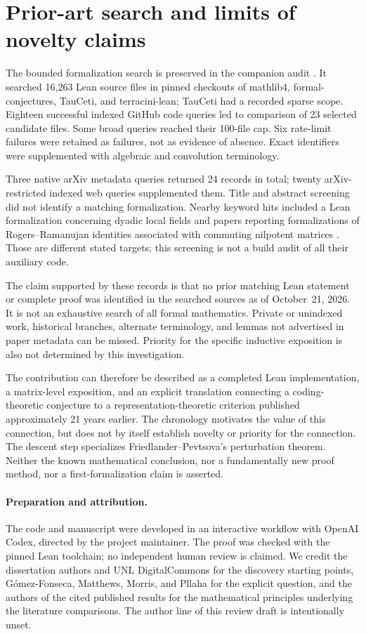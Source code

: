 \documentclass[11pt]{article}
\theoremstyle{definition}
\begin{document}
\section{Prior-art search and limits of novelty claims}\label{sec:priority}

The bounded formalization search is preserved in the companion audit \cite{artifact}. It searched 16,263 Lean source files in pinned checkouts of mathlib4, formal-conjectures, TauCeti, and terracini-lean; TauCeti had a recorded sparse scope. Eighteen successful indexed GitHub code queries led to comparison of 23 selected candidate files. Some broad queries reached their 100-file cap. Six rate-limit failures were retained as failures, not as evidence of absence. Exact identifiers were supplemented with algebraic and convolution terminology.

Three native arXiv metadata queries returned 24 records in total; twenty arXiv-restricted indexed web queries supplemented them. Title and abstract screening did not identify a matching formalization. Nearby keyword hits included a Lean formalization concerning dyadic local fields \cite{ueda} and papers reporting formalizations of Rogers--Ramanujan identities associated with commuting nilpotent matrices \cite{hlo,hlop}. Those are different stated targets; this screening is not a build audit of all their auxiliary code.

The claim supported by these records is that no prior matching Lean statement or complete proof was identified in the searched sources as of October~21, 2026. It is not an exhaustive search of all formal mathematics. Private or unindexed work, historical branches, alternate terminology, and lemmas not advertised in paper metadata can be missed. Priority for the specific inductive exposition is also not determined by this investigation.

The contribution can therefore be described as a completed Lean implementation, a matrix-level exposition, and an explicit translation connecting a coding-theoretic conjecture to a representation-theoretic criterion published approximately 21 years earlier. The chronology motivates the value of this connection, but does not by itself establish novelty or priority for the connection. The descent step specializes Friedlander--Pevtsova's perturbation theorem. Neither the known mathematical conclusion, nor a fundamentally new proof method, nor a first-formalization claim is asserted.

\paragraph{Preparation and attribution.}
The code and manuscript were developed in an interactive workflow with OpenAI Codex, directed by the project maintainer. The proof was checked with the pinned Lean toolchain; no independent human review is claimed. We credit the dissertation authors and UNL DigitalCommons for the discovery starting points, G\'omez-Fonseca, Matthews, Morris, and Pllaha for the explicit question, and the authors of the cited published results for the mathematical principles underlying the literature comparisons. The author line of this review draft is intentionally unset.
\end{document}
